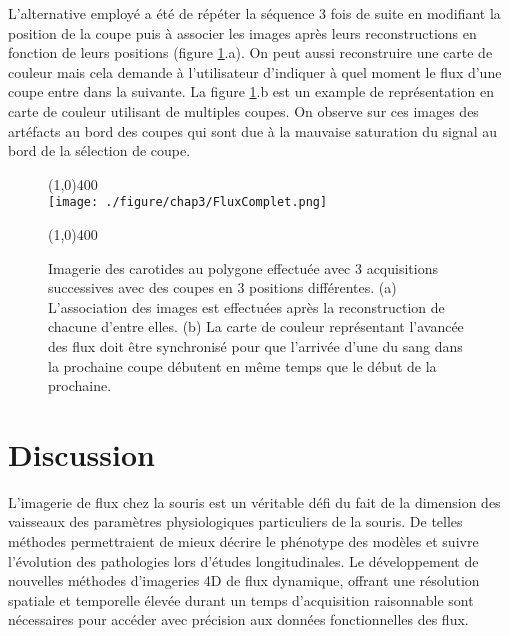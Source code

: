 L'alternative employé a été de répéter la séquence 3 fois de suite en modifiant la position de la coupe puis à associer les images après leurs reconstructions en fonction de leurs positions (figure \ref{fig:FluxComplet}.a). On peut aussi reconstruire une carte de couleur mais cela demande à l'utilisateur d'indiquer à quel moment le flux d'une coupe entre dans la suivante. La figure \ref{fig:FluxComplet}.b est un example de représentation en carte de couleur utilisant de multiples coupes. On observe sur ces images des artéfacts au bord des coupes qui sont due à la mauvaise saturation du signal au bord de la sélection de coupe.

\begin{figure}[H]
\centering \line(1,0){400} \\
\texttt{[image: ./figure/chap3/FluxComplet.png]}
\caption[Image d'ARM dynamique sur souris des carotides au polygone de Willis]{\label{fig:FluxComplet} Imagerie des carotides au polygone effectuée avec 3 acquisitions successives avec des coupes en 3 positions différentes. (a) L'association des images est effectuées après la reconstruction de chacune d'entre elles. (b) La carte de couleur représentant l'avancée des flux doit être synchronisé pour que l'arrivée d'une du sang dans la prochaine coupe débutent en même temps que le début de la prochaine.}
\line(1,0){400} \\ \end{figure}

\section{Discussion}

L'imagerie de flux chez la souris est un véritable défi du fait de la dimension des vaisseaux des paramètres physiologiques particuliers de la souris. De telles méthodes permettraient de mieux décrire le phénotype des modèles et suivre l'évolution des pathologies lors d'études longitudinales. Le développement de nouvelles méthodes d'imageries 4D de flux dynamique, offrant une résolution spatiale et temporelle élevée durant un temps d'acquisition raisonnable sont nécessaires pour accéder avec précision aux données fonctionnelles des flux.

